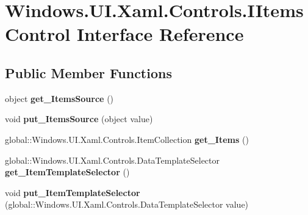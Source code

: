 \hypertarget{interface_windows_1_1_u_i_1_1_xaml_1_1_controls_1_1_i_items_control}{}\section{Windows.\+U\+I.\+Xaml.\+Controls.\+I\+Items\+Control Interface Reference}
\label{interface_windows_1_1_u_i_1_1_xaml_1_1_controls_1_1_i_items_control}
\subsection*{Public Member Functions}
\begin{DoxyCompactItemize}
\item 
\mbox{\label{interface_windows_1_1_u_i_1_1_xaml_1_1_controls_1_1_i_items_control_a7f2312123673103e92e3794fabb7c45a}} 
object {\bfseries get\+\_\+\+Items\+Source} ()
\item 
\mbox{\label{interface_windows_1_1_u_i_1_1_xaml_1_1_controls_1_1_i_items_control_ac735d213748166057ef4cbaae62e336e}} 
void {\bfseries put\+\_\+\+Items\+Source} (object value)
\item 
\mbox{\label{interface_windows_1_1_u_i_1_1_xaml_1_1_controls_1_1_i_items_control_a747bf3c87ce3337134354f5d9b743404}} 
global\+::\+Windows.\+U\+I.\+Xaml.\+Controls.\+Item\+Collection {\bfseries get\+\_\+\+Items} ()
\item 
\mbox{\label{interface_windows_1_1_u_i_1_1_xaml_1_1_controls_1_1_i_items_control_ab87924da926fb493c4e9f1d66f5e3327}} 
global\+::\+Windows.\+U\+I.\+Xaml.\+Controls.\+Data\+Template\+Selector {\bfseries get\+\_\+\+Item\+Template\+Selector} ()
\item 
\mbox{\label{interface_windows_1_1_u_i_1_1_xaml_1_1_controls_1_1_i_items_control_aa561637adcee5715eed974d70e6d813a}} 
void {\bfseries put\+\_\+\+Item\+Template\+Selector} (global\+::\+Windows.\+U\+I.\+Xaml.\+Controls.\+Data\+Template\+Selector value)

\end{DoxyCompactItemize}
